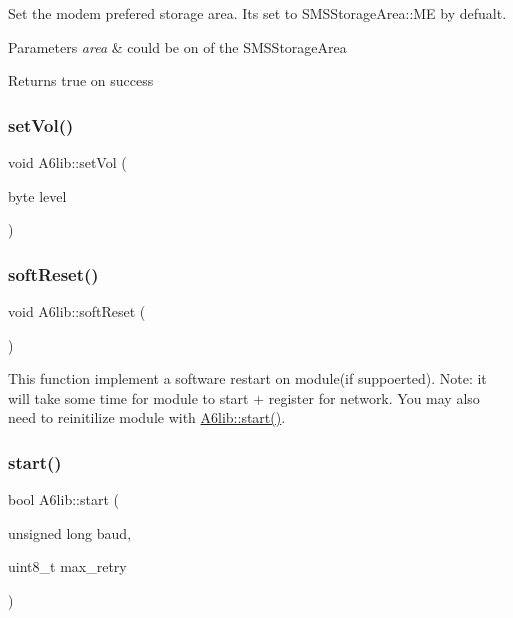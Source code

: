 Set the modem prefered storage area. It\textquotesingle{}s set to S\+M\+S\+Storage\+Area\+::\+ME by defualt. 
\begin{DoxyParams}{Parameters}
{\em area} & could be on of the S\+M\+S\+Storage\+Area \\
\hline
\end{DoxyParams}
\begin{DoxyReturn}{Returns}
true on success 
\end{DoxyReturn}
\mbox{\label{class_a6lib_a4042e45892004cd9273f1b1c85d86ffc}} 
\subsubsection{\texorpdfstring{set\+Vol()}{setVol()}}
{\footnotesize\ttfamily void A6lib\+::set\+Vol (\begin{DoxyParamCaption}\item[{byte}]{level }\end{DoxyParamCaption})}

\mbox{\label{class_a6lib_a8b64136d0c8aba6af51568ff93a5455e}} 
\subsubsection{\texorpdfstring{soft\+Reset()}{softReset()}}
{\footnotesize\ttfamily void A6lib\+::soft\+Reset (\begin{DoxyParamCaption}{ }\end{DoxyParamCaption})}

This function implement a software restart on module(if suppoerted). Note\+: it will take some time for module to start + register for network. You may also need to reinitilize module with \mbox{\hyperlink{class_a6lib_a4c9b1bef86c734cb57e7962936ecf481}{A6lib\+::start()}}. \mbox{\label{class_a6lib_a4c9b1bef86c734cb57e7962936ecf481}} 
\subsubsection{\texorpdfstring{start()}{start()}}
{\footnotesize\ttfamily bool A6lib\+::start (\begin{DoxyParamCaption}\item[{unsigned long}]{baud,  }\item[{uint8\+\_\+t}]{max\+\_\+retry }\end{DoxyParamCaption})}

